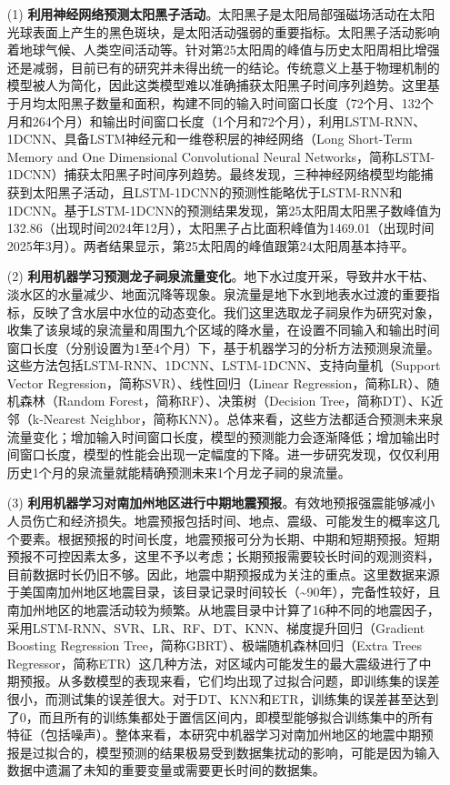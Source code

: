 \begin{enumerate}

  \item[(1)] \textbf{利用神经网络预测太阳黑子活动}。太阳黑子是太阳局部强磁场活动在太阳光球表面上产生的黑色斑块，是太阳活动强弱的重要指标。太阳黑子活动影响着地球气候、人类空间活动等。针对第25太阳周的峰值与历史太阳周相比增强还是减弱，目前已有的研究并未得出统一的结论。传统意义上基于物理机制的模型被人为简化，因此这类模型难以准确捕获太阳黑子时间序列趋势。这里基于月均太阳黑子数量和面积，构建不同的输入时间窗口长度（72个月、132个月和264个月）和输出时间窗口长度（1个月和72个月），利用LSTM-RNN、1DCNN、具备LSTM神经元和一维卷积层的神经网络（Long Short-Term Memory and One Dimensional Convolutional Neural Networks，简称LSTM-1DCNN）捕获太阳黑子时间序列趋势。最终发现，三种神经网络模型均能捕获到太阳黑子活动，且LSTM-1DCNN的预测性能略优于LSTM-RNN和1DCNN。基于LSTM-1DCNN的预测结果发现，第25太阳周太阳黑子数峰值为132.86（出现时间2024年12月），太阳黑子占比面积峰值为1469.01（出现时间2025年3月）。两者结果显示，第25太阳周的峰值跟第24太阳周基本持平。

  \item[{(2)}] \textbf{利用机器学习预测龙子祠泉流量变化}。地下水过度开采，导致井水干枯、淡水区的水量减少、地面沉降等现象。泉流量是地下水到地表水过渡的重要指标，反映了含水层中水位的动态变化。我们这里选取龙子祠泉作为研究对象，收集了该泉域的泉流量和周围九个区域的降水量，在设置不同输入和输出时间窗口长度（分别设置为1至4个月）下，基于机器学习的分析方法预测泉流量。这些方法包括LSTM-RNN、1DCNN、LSTM-1DCNN、支持向量机（Support Vector Regression，简称SVR）、线性回归（Linear Regression，简称LR）、随机森林（Random Forest，简称RF）、决策树（Decision Tree，简称DT）、K近邻（k-Nearest Neighbor，简称KNN）。总体来看，这些方法都适合预测未来泉流量变化；增加输入时间窗口长度，模型的预测能力会逐渐降低；增加输出时间窗口长度，模型的性能会出现一定幅度的下降。进一步研究发现，仅仅利用历史1个月的泉流量就能精确预测未来1个月龙子祠的泉流量。
  
  \item[(3)] \textbf{利用机器学习对南加州地区进行中期地震预报}。有效地预报强震能够减小人员伤亡和经济损失。地震预报包括时间、地点、震级、可能发生的概率这几个要素。根据预报的时间长度，地震预报可分为长期、中期和短期预报。短期预报不可控因素太多，这里不予以考虑；长期预报需要较长时间的观测资料，目前数据时长仍旧不够。因此，地震中期预报成为关注的重点。这里数据来源于美国南加州地区地震目录，该目录记录时间较长（\sim 90年），完备性较好，且南加州地区的地震活动较为频繁。从地震目录中计算了16种不同的地震因子，采用LSTM-RNN、SVR、LR、RF、DT、KNN、梯度提升回归（Gradient Boosting Regression Tree，简称GBRT）、极端随机森林回归（Extra Trees Regressor，简称ETR）这几种方法，对区域内可能发生的最大震级进行了中期预报。从多数模型的表现来看，它们均出现了过拟合问题，即训练集的误差很小，而测试集的误差很大。对于DT、KNN和ETR，训练集的误差甚至达到了0，而且所有的训练集都处于置信区间内，即模型能够拟合训练集中的所有特征（包括噪声）。整体来看，本研究中机器学习对南加州地区的地震中期预报是过拟合的，模型预测的结果极易受到数据集扰动的影响，可能是因为输入数据中遗漏了未知的重要变量或需要更长时间的数据集。


\end{enumerate}
